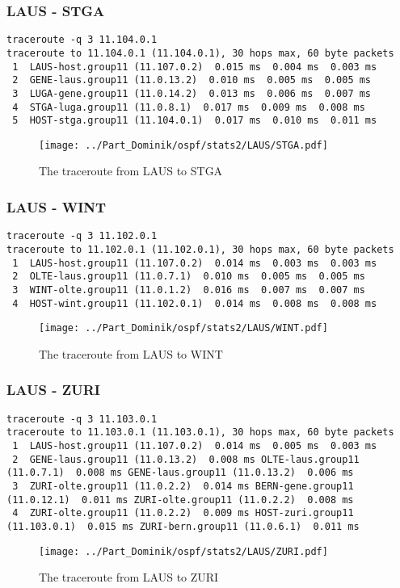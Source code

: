 \subsubsection{LAUS - STGA}
\begin{lstlisting}
traceroute -q 3 11.104.0.1
traceroute to 11.104.0.1 (11.104.0.1), 30 hops max, 60 byte packets
 1  LAUS-host.group11 (11.107.0.2)  0.015 ms  0.004 ms  0.003 ms
 2  GENE-laus.group11 (11.0.13.2)  0.010 ms  0.005 ms  0.005 ms
 3  LUGA-gene.group11 (11.0.14.2)  0.013 ms  0.006 ms  0.007 ms
 4  STGA-luga.group11 (11.0.8.1)  0.017 ms  0.009 ms  0.008 ms
 5  HOST-stga.group11 (11.104.0.1)  0.017 ms  0.010 ms  0.011 ms
\end{lstlisting}
\begin{figure}[H]
\centering
\texttt{[image: ../Part\_Dominik/ospf/stats2/LAUS/STGA.pdf]}
\caption{The traceroute from LAUS to STGA}
\end{figure}
\clearpage
\subsubsection{LAUS - WINT}
\begin{lstlisting}
traceroute -q 3 11.102.0.1
traceroute to 11.102.0.1 (11.102.0.1), 30 hops max, 60 byte packets
 1  LAUS-host.group11 (11.107.0.2)  0.014 ms  0.003 ms  0.003 ms
 2  OLTE-laus.group11 (11.0.7.1)  0.010 ms  0.005 ms  0.005 ms
 3  WINT-olte.group11 (11.0.1.2)  0.016 ms  0.007 ms  0.007 ms
 4  HOST-wint.group11 (11.102.0.1)  0.014 ms  0.008 ms  0.008 ms
\end{lstlisting}
\begin{figure}[H]
\centering
\texttt{[image: ../Part\_Dominik/ospf/stats2/LAUS/WINT.pdf]}
\caption{The traceroute from LAUS to WINT}
\end{figure}
\clearpage
\subsubsection{LAUS - ZURI}
\begin{lstlisting}
traceroute -q 3 11.103.0.1
traceroute to 11.103.0.1 (11.103.0.1), 30 hops max, 60 byte packets
 1  LAUS-host.group11 (11.107.0.2)  0.014 ms  0.005 ms  0.003 ms
 2  GENE-laus.group11 (11.0.13.2)  0.008 ms OLTE-laus.group11 (11.0.7.1)  0.008 ms GENE-laus.group11 (11.0.13.2)  0.006 ms
 3  ZURI-olte.group11 (11.0.2.2)  0.014 ms BERN-gene.group11 (11.0.12.1)  0.011 ms ZURI-olte.group11 (11.0.2.2)  0.008 ms
 4  ZURI-olte.group11 (11.0.2.2)  0.009 ms HOST-zuri.group11 (11.103.0.1)  0.015 ms ZURI-bern.group11 (11.0.6.1)  0.011 ms
\end{lstlisting}
\begin{figure}[H]
\centering
\texttt{[image: ../Part\_Dominik/ospf/stats2/LAUS/ZURI.pdf]}
\caption{The traceroute from LAUS to ZURI}
\end{figure}
\clearpage

